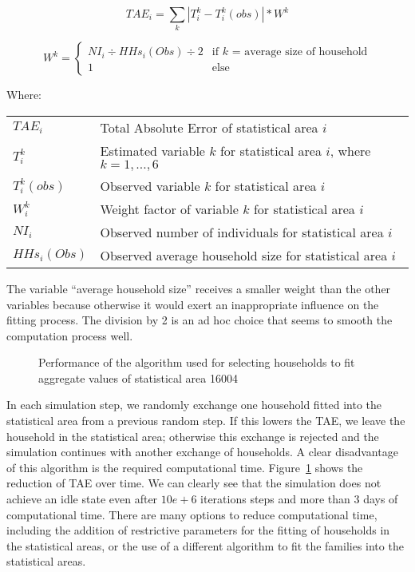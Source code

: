 \documentclass[11pt]{IJM-article}
\begin{document}
\parbox{\textwidth}{
    \begin{equation} 
        \label{eq:1} 
        TAE_i = \sum_{k} |T_i^{k} - T_i^{k}(obs)| * W^k 
    \end{equation} 
    
    \begin{equation} 
        \label{eq:2} 
        W^k = \begin{cases} 
            NI_{i} \div HHs_{i}(Obs) \div 2 & \text{if $k$ = average size of
                household} \\ 
            1 & \text{else} 
        \end{cases} 
    \end{equation} 

    \noindent Where:\\
    \begin{tabular}{lp{15cm}} 
        $TAE_i$ & Total Absolute Error of statistical area $i$ \\ 
        $T_i^{k}$ & Estimated variable $k$ for statistical area $i$, 
            where $k = 1, \dots , 6$ \\ 
        $T_i^{k}(obs)$ & Observed variable $k$ for statistical area $i$ \\ 
        $W_i^k$ & Weight factor of variable $k$ for statistical area $i$\\
        $NI_{i}$ & Observed number of individuals for statistical area $i$ \\
        $HHs_{i}(Obs)$ & Observed average household size for statistical 
            area $i$ \\
    \end{tabular} 
}


The variable ``average household size'' receives a smaller weight than the other
variables because otherwise it would exert an inappropriate influence on the
fitting process. The division by 2 is an ad hoc choice that seems to smooth
the computation process well.

\begin{figure}[htb]
    \caption{Performance of the algorithm used for selecting households to fit
    aggregate values of statistical area 16004}\label{fig:4}
    \centering 
    
\end{figure}

In each simulation step, we randomly exchange one household fitted into the
statistical area from a previous random step. If this lowers the TAE, we leave
the household in the statistical area; otherwise this exchange is rejected and
the simulation continues with another exchange of households. A clear
disadvantage of this algorithm is the required computational time.
Figure~\ref{fig:4} shows the reduction of TAE over time. We can clearly see
that the simulation does not achieve an idle state even after $10e+6$
iterations steps and more than 3 days of computational time. There are many
options to reduce computational time, including the addition of restrictive
parameters for the fitting of households in the statistical areas, or the use
of a different algorithm to fit the families into the statistical areas.
\end{document}

